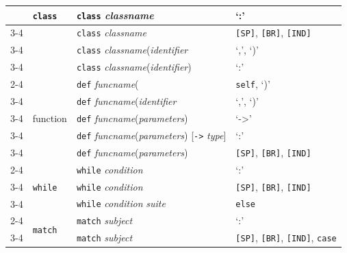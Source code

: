 \begin{table}[!t]
\begin{tabular}{m{2.8cm}m{2cm}m{6.5cm}m{5cm}}
        & \multirow{3}{*}{\texttt{class}}  & \texttt{class} \textit{classname} & `:' \\
        \cmidrule{3-4}
        & & \texttt{class} \textit{classname}\text{:} & \texttt{[SP]}, \texttt{[BR]}, \texttt{[IND]}  \\
        \cmidrule{3-4}
        & & \texttt{class} \textit{classname}(\textit{identifier} &  `,', `)'  \\
        \cmidrule{3-4}
         & & \texttt{class} \textit{classname}(\textit{identifier}) &   `:'  \\
        \cmidrule{2-4}
        & \multirow{5}{*}{function} & \texttt{def} \textit{funcname}( & \texttt{self}, `)' \\
        \cmidrule{3-4}
        & & \texttt{def} \textit{funcname}(\textit{identifier} & `,', `)' \\
        \cmidrule{3-4}
        & & \texttt{def} \textit{funcname}(\textit{parameters}) &  `->' \\
        \cmidrule{3-4}
        & & \texttt{def} \textit{funcname}(\textit{parameters}) [\texttt{->} \textit{type}] & `:' \\
        \cmidrule{3-4}
        & & \texttt{def} \textit{funcname}(\textit{parameters})\text{:} & \texttt{[SP]}, \texttt{[BR]}, \texttt{[IND]}  \\
        \cmidrule{2-4}
        & \multirow{3}{*}{\texttt{while}} & \texttt{while} \textit{condition} & `:'\\
        \cmidrule{3-4}
        & & \texttt{while} \textit{condition}\text{:} & \texttt{[SP]}, \texttt{[BR]}, \texttt{[IND]}  \\
        \cmidrule{3-4}
        & & \texttt{while} \textit{condition}\text{:} \textit{suite}& \texttt{else}\\
        \cmidrule{2-4}
        & \multirow{2}{*}{\texttt{match}} & \texttt{match} \textit{subject} & `:' \\
        \cmidrule{3-4}
        & & \texttt{match} \textit{subject}\text{:} &\texttt{[SP]}, \texttt{[BR]}, \texttt{[IND]}, \texttt{case}  \\
        
        \bottomrule
    \end{tabular}
\end{table}

